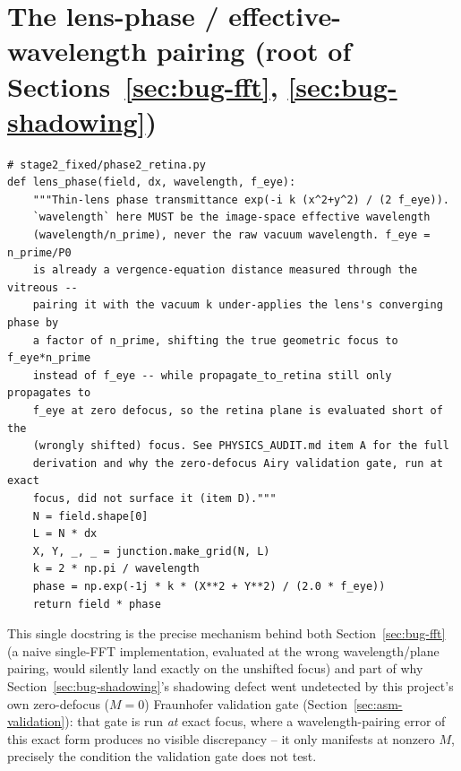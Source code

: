 \section{The lens-phase / effective-wavelength pairing (root of Sections~\ref{sec:bug-fft}, \ref{sec:bug-shadowing})}
\begin{lstlisting}[basicstyle=\ttfamily\small,breaklines=true]
# stage2_fixed/phase2_retina.py
def lens_phase(field, dx, wavelength, f_eye):
    """Thin-lens phase transmittance exp(-i k (x^2+y^2) / (2 f_eye)).
    `wavelength` here MUST be the image-space effective wavelength
    (wavelength/n_prime), never the raw vacuum wavelength. f_eye = n_prime/P0
    is already a vergence-equation distance measured through the vitreous --
    pairing it with the vacuum k under-applies the lens's converging phase by
    a factor of n_prime, shifting the true geometric focus to f_eye*n_prime
    instead of f_eye -- while propagate_to_retina still only propagates to
    f_eye at zero defocus, so the retina plane is evaluated short of the
    (wrongly shifted) focus. See PHYSICS_AUDIT.md item A for the full
    derivation and why the zero-defocus Airy validation gate, run at exact
    focus, did not surface it (item D)."""
    N = field.shape[0]
    L = N * dx
    X, Y, _, _ = junction.make_grid(N, L)
    k = 2 * np.pi / wavelength
    phase = np.exp(-1j * k * (X**2 + Y**2) / (2.0 * f_eye))
    return field * phase
\end{lstlisting}
This single docstring is the precise mechanism behind both Section~\ref{sec:bug-fft}
(a naive single-FFT implementation, evaluated at the wrong wavelength/plane pairing,
would silently land exactly on the unshifted focus) and part of why
Section~\ref{sec:bug-shadowing}'s shadowing defect went undetected by this project's
own zero-defocus ($M=0$) Fraunhofer validation gate (Section~\ref{sec:asm-validation}):
that gate is run \emph{at} exact focus, where a wavelength-pairing error of this exact
form produces no visible discrepancy -- it only manifests at nonzero $M$, precisely the
condition the validation gate does not test.

